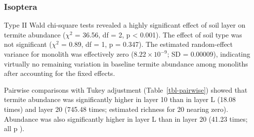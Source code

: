 \documentclass[
  american,
  11pt,
]{stylisharticle}
\begin{document}
\subsubsection{Isoptera}\label{isoptera}

Type II Wald chi-square tests revealed a highly significant effect of
soil layer on termite abundance (\(\chi^2\) = 36.56, df = 2, p
\textless{} 0.001). The effect of soil type was not significant
(\(\chi^2\) = 0.89, df = 1, p = 0.347). The estimated random-effect
variance for monolith was effectively zero (\(8.22 \times 10^{-9}\); SD
= 0.00009), indicating virtually no remaining variation in baseline
termite abundance among monoliths after accounting for the fixed
effects.

Pairwise comparisons with Tukey adjustment (Table~\ref{tbl-pairwise})
showed that termite abundance was significantly higher in layer 10 than
in layer L (18.08 times) and layer 20 (745.48 times; estimated richness
for 20 nearing zero). Abundance was also significantly higher in layer L
than in layer 20 (41.23 times; all p ).

\begin{table}

\caption{\label{tbl-pairwise}Pairwise emmeans comparisons of abundance
by layer for total macrofauna, ants (Formicidae) and termites
(Isoptera).}


\end{table}%
\end{document}
